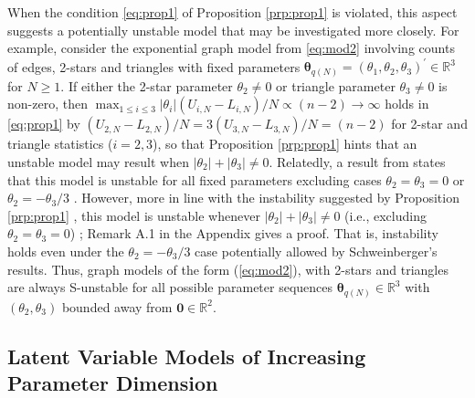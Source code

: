 \documentclass[numbib]{imamat}
\theoremstyle{theorem}
\theoremstyle{lemma}
\theoremstyle{example}
\theoremstyle{corollary}
\theoremstyle{definition}
\theoremstyle{remark}
\theoremstyle{approximation}
\theoremstyle{scheme}
\newcommand{\thetaidx}{q(N)}
\newcommand{\thetaN}{\boldsymbol \theta_{\thetaidx}}
\newcommand{\ak}[1]{{\color{blue} #1}}
\begin{document}
When the condition \eqref{eq:prop1} of Proposition \ref{prp:prop1} is violated, this aspect suggests a potentially unstable model that may be investigated more closely. For example, consider the exponential graph model from \eqref{eq:mod2} involving counts of edges, 2-stars and triangles with fixed parameters \(\thetaN = (\theta_{1},\theta_2,\theta_3)^\prime \in \mathbb{R}^3\) for \(N\geq 1\). If either the 2-star parameter \(\theta_2 \neq 0\) or triangle parameter \(\theta_3 \neq 0\) is non-zero, then \(\max_{1 \leq i \leq 3 } |\theta_{i}|(U_{i,N}-L_{i,N})/N \propto (n-2)\to \infty\) holds in \eqref{eq:prop1} by \((U_{2,N}-L_{2,N})/N = 3 (U_{3,N}-L_{3,N})/N=(n-2)\) for 2-star and triangle statistics (\(i=2,3\)), so that Proposition \ref{prp:prop1} hints that an unstable model may result when \(|\theta_2| + |\theta_3| \neq 0\). Relatedly, a result from \citet[Result 3]{schweinberger2011instability} states that this model is unstable for all fixed parameters excluding cases \(\theta_2 =\theta_3=0\) or \(\theta_2 = - \theta_3/3\)\ak{. However, more in line} with the instability suggested by Proposition \ref{prp:prop1}\ak{, this model is unstable} whenever \(|\theta_2| + |\theta_3| \neq 0\) (i.e., excluding \(\theta_2 =\theta_3=0\))\ak{; Remark A.1 in the Appendix gives a proof.} That is, instability holds even under \ak{the} \(\theta_2 = - \theta_3/3\) case potentially allowed by Schweinberger's \citeyearpar{schweinberger2011instability} results. \ak{Thus, graph models of the form (\ref{eq:mod2}), with 2-stars and triangles are always S-unstable for all possible parameter sequences $\thetaN \in \mathbb{R}^3$ with $(\theta_2, \theta_3)$ bounded away from $\boldsymbol 0 \in \mathbb{R}^2$.}

\hypertarget{latent-variable-models-of-increasing-parameter-dimension}{%
\subsection{Latent Variable Models of Increasing Parameter Dimension}\label{latent-variable-models-of-increasing-parameter-dimension}}
\end{document}
